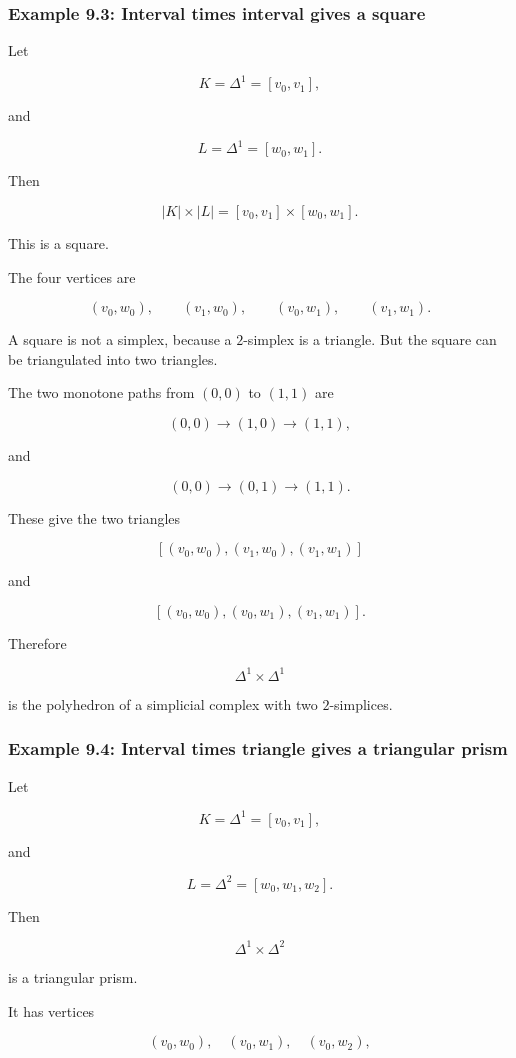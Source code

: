 \documentclass[12pt,a4paper]{article}
\theoremstyle{notespace}
\begin{document}
\subsubsection{Example 9.3: Interval times interval gives a square}

Let

\[
K=\Delta^1=[v_0,v_1],
\]

and

\[
L=\Delta^1=[w_0,w_1].
\]

Then

\[
|K|\times |L|
=
[v_0,v_1]\times [w_0,w_1].
\]

This is a square.

The four vertices are

\[
(v_0,w_0),
\qquad
(v_1,w_0),
\qquad
(v_0,w_1),
\qquad
(v_1,w_1).
\]

A square is not a simplex, because a \(2\)-simplex is a triangle. But the square can be triangulated into two triangles.

The two monotone paths from \((0,0)\) to \((1,1)\) are

\[
(0,0)\to(1,0)\to(1,1),
\]

and

\[
(0,0)\to(0,1)\to(1,1).
\]

These give the two triangles

\[
[(v_0,w_0),(v_1,w_0),(v_1,w_1)]
\]

and

\[
[(v_0,w_0),(v_0,w_1),(v_1,w_1)].
\]

Therefore

\[
\Delta^1\times \Delta^1
\]

is the polyhedron of a simplicial complex with two \(2\)-simplices.

\subsubsection{Example 9.4: Interval times triangle gives a triangular prism}

Let

\[
K=\Delta^1=[v_0,v_1],
\]

and

\[
L=\Delta^2=[w_0,w_1,w_2].
\]

Then

\[
\Delta^1\times \Delta^2
\]

is a triangular prism.

It has vertices

\[
(v_0,w_0),
\quad
(v_0,w_1),
\quad
(v_0,w_2),
\]
\end{document}
